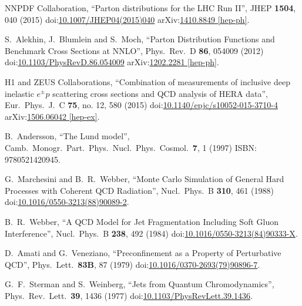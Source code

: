 \begin{thebibliography}{99}
NNPDF Collaboration, ``Parton distributions for the LHC Run II'', JHEP {\bf 1504}, 040 (2015) doi:\href{http://dx.doi.org/10.1007/JHEP04(2015)040}{10.1007/JHEP04(2015)040} arXiv:\href{https://arxiv.org/abs/1410.8849}{1410.8849 [hep-ph]}.

S.~Alekhin, J.~Blumlein and S.~Moch, ``Parton Distribution Functions and Benchmark Cross Sections at NNLO'', Phys.\ Rev.\ D {\bf 86}, 054009 (2012) doi:\href{http://dx.doi.org/10.1103/PhysRevD.86.054009}{10.1103/PhysRevD.86.054009} arXiv:\href{https://arxiv.org/abs/1202.2281}{1202.2281 [hep-ph]}.

H1 and ZEUS Collaborations, ``Combination of measurements of inclusive deep inelastic ${e^{\pm }p}$ scattering cross sections and QCD analysis of HERA data'', Eur.\ Phys.\ J.\ C {\bf 75}, no. 12, 580 (2015) doi:\href{http://dx.doi.org/10.1140/epjc/s10052-015-3710-4}{10.1140/epjc/s10052-015-3710-4} arXiv:\href{https://arxiv.org/abs/1506.06042}{1506.06042 [hep-ex]}.

B.~Andersson, ``The Lund model'', Camb.\ Monogr.\ Part.\ Phys.\ Nucl.\ Phys.\ Cosmol.\ {\bf 7}, 1 (1997) ISBN: 9780521420945. 


G.~Marchesini and B.~R.~Webber, ``Monte Carlo Simulation of General Hard Processes with Coherent QCD Radiation'', Nucl.\ Phys.\ B {\bf 310}, 461 (1988) doi:\href{http://dx.doi.org/10.1016/0550-3213(88)90089-2}{10.1016/0550-3213(88)90089-2}.

B.~R.~Webber, ``A QCD Model for Jet Fragmentation Including Soft Gluon Interference'', Nucl.\ Phys.\ B {\bf 238}, 492 (1984) doi:\href{http://dx.doi.org/10.1016/0550-3213(84)90333-X}{10.1016/0550-3213(84)90333-X}.

D.~Amati and G.~Veneziano, ``Preconfinement as a Property of Perturbative QCD'', Phys.\ Lett.\ {\bf 83B}, 87 (1979) doi:\href{http://dx.doi.org/10.1016/0370-2693(79)90896-7}{10.1016/0370-2693(79)90896-7}.

G.~F.~Sterman and S.~Weinberg, ``Jets from Quantum Chromodynamics'', Phys.\ Rev.\ Lett.\ {\bf 39}, 1436 (1977) doi:\href{http://dx.doi.org/10.1103/PhysRevLett.39.1436}{10.1103/PhysRevLett.39.1436}.


\end{thebibliography}
